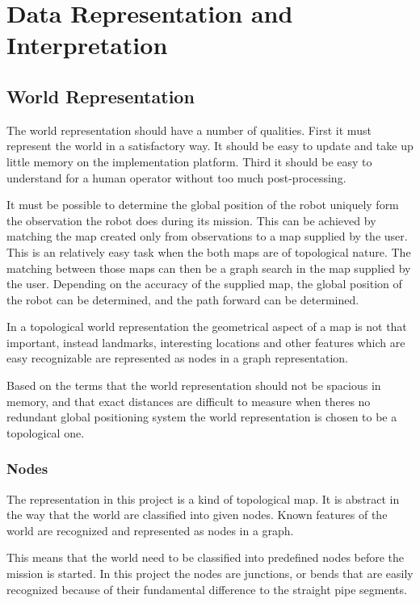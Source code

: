 

\chapter{Data Representation and Interpretation}
\label{chap5}


\section{World Representation}
The world representation should have a number of qualities. First it must represent the
world in a satisfactory way. It should be easy to update and take up little memory on the
implementation platform. Third it should be easy to understand for a human operator
without too much post-processing. 

It must be possible to determine the global position of the robot uniquely form the
observation the robot does during its mission. This can be achieved by matching the map
created only from observations to a map supplied by the user. This is an relatively easy
task when the both maps are of topological nature. The matching between those maps can
then be a graph search in the map supplied by the user. Depending on the accuracy of the
supplied map, the global position of the robot can be determined, and the path forward can
be determined. 

In a topological world representation the geometrical aspect of a map is not that
important, instead landmarks, interesting locations and other features which are easy 
recognizable are represented as nodes in a graph representation. 

Based on the terms that the world representation should not be spacious in memory, and
that exact distances are difficult to measure when theres no redundant global positioning
system the world representation is chosen to be a topological one. 


\subsection{Nodes}
The representation in this project is a kind of topological map. It is abstract in the way
that the world are classified into given nodes. Known features of the world are recognized
and represented as nodes in a graph. 

This means that the world need to be classified into predefined nodes before the mission
is started. In this project the nodes are junctions, or bends that are easily recognized
because of their fundamental difference to the straight pipe segments. 

